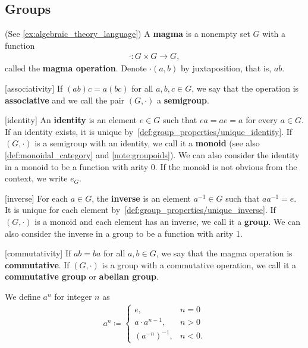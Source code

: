 \subsection{Groups}\label{subsec:groups}

\begin{definition}\label{def:group}(See \cref{ex:algebraic_theory_language})
  A \textbf{magma} is a nonempty set \( G \) with a function 
  \begin{align*}
    \cdot: G \times G \to G,
  \end{align*}
  called the \textbf{magma operation}. Denote \( \cdot(a, b) \) by juxtaposition, that is, \( ab \).

  \begin{description}
    [associativity] If \( (ab)c = a(bc) \) for all \( a, b, c \in G \), we say that the operation is \textbf{associative} and we call the pair \( (G, \cdot) \) a \textbf{semigroup}.

    [identity] An \textbf{identity} is an element \( e \in G \) such that \( ea = ae = a \) for every \( a \in G \). If an identity exists, it is unique by~\cref{def:group_properties/unique_identity}. If \( (G, \cdot) \) is a semigroup with an identity, we call it a \textbf{monoid} (see also \cref{def:monoidal_category} and \cref{note:groupoids}). We can also consider the identity in a monoid to be a function with arity 0. If the monoid is not obvious from the context, we write \( e_G \).

    [inverse] For each \( a \in G \), the \textbf{inverse} is an element \( a^{-1} \in G \) such that \( aa^{-1} = e \). It is unique for each element by~\cref{def:group_properties/unique_inverse}. If \( (G, \cdot) \) is a monoid and each element has an inverse, we call it a \textbf{group}. We can also consider the inverse in a group to be a function with arity 1.

    [commutativity] If \( ab = ba \) for all \( a, b \in G \), we say that the magma operation is \textbf{commutative}. If \( (G, \cdot) \) is a group with a commutative operation, we call it a \textbf{commutative group} or \textbf{abelian group}.
  \end{description}

  We define \( a^n \) for integer \( n \) as
  \begin{align*}
    a^n \coloneqq \begin{cases}
      e, &n = 0 \\
      a \cdot a^{n-1}, &n > 0 \\
      (a^{-n})^{-1}, &n < 0.
    \end{cases}
  \end{align*}


\end{definition}
